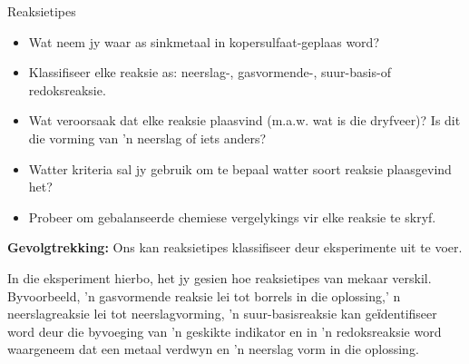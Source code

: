 {{\begin{g_experiment}{Reaksietipes}
\begin{itemize}[noitemsep]
\item Wat neem jy waar as sinkmetaal in kopersulfaat-geplaas word?
\item Klassifiseer elke reaksie as: neerslag-, gasvormende-, suur-basis-of redoksreaksie.
\item Wat veroorsaak dat elke reaksie plaasvind (m.a.w. wat is die dryfveer)? Is dit die vorming van 'n neerslag of iets anders?
\item Watter kriteria sal jy gebruik om te bepaal watter soort reaksie plaasgevind het?
\item Probeer om gebalanseerde chemiese vergelykings vir elke reaksie te skryf.
\end{itemize}
        \par 
\label{m38719*eip-1904}\noindent{}\textbf{Gevolgtrekking: }\newline
Ons kan reaksietipes klassifiseer deur eksperimente uit te voer.
\par 
\end{g_experiment}
In die eksperiment hierbo, het jy gesien hoe reaksietipes van mekaar verskil. Byvoorbeeld, 'n gasvormende reaksie lei tot borrels in die oplossing,' n neerslagreaksie lei tot  neerslagvorming, 'n suur-basisreaksie kan geїdentifiseer word deur die byvoeging van 'n  geskikte indikator en in 'n redoksreaksie word waargeneem dat een metaal verdwyn en 'n neerslag vorm in die oplossing.\par  
\label{m38719*eip-796}
}}
